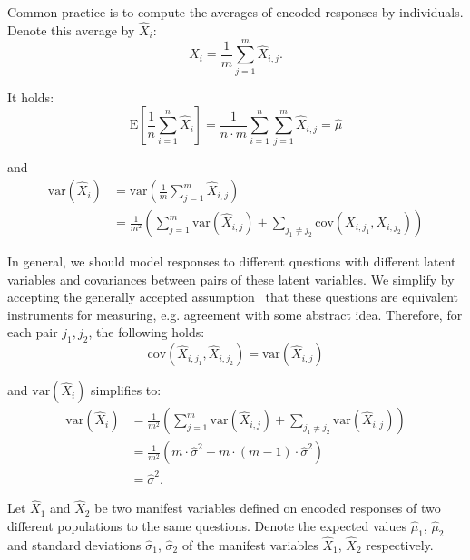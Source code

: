 \documentclass[10pt]{article}
\begin{document}
Common practice is to compute the averages of encoded responses by individuals. Denote this average by $\hat{X}_{i}$:
\begin{equation}
\hat{X}_{i} = \frac{1}{m} \sum_{j = 1}^{m} \hat{X}_{i, j}.
\end{equation}

It holds:
\begin{equation}
\mathrm{E}[\frac{1}{n} \sum_{i=1}^{n} \hat{X}_{i}] = \frac{1}{n \cdot m} \sum	_{i=1}^{n} \sum_{j=1}^{m} \hat{X}_{i,j} = \hat{\mu}
\end{equation}

and
\begin{align*}
\mathrm{var}(\hat{X}_{i}) &= \mathrm{var} \left( \frac{1}{m} \sum_{j=1}^{m} \hat{X}_{i, j} \right) \\
&= \frac{1}{m^{2}} \left( \sum_{j=1}^{m} \mathrm{var}(\hat{X}_{i,j}) + \sum_{j_{1} \neq j_{2}} \mathrm{cov}(X_{i,j_{1}}, X_{i, j_{2}})
\right)
\end{align*}

In general, we should model responses to different questions with different latent variables and covariances between pairs of these latent variables. We simplify by accepting the generally accepted assumption~\cite{Alphen} that these questions are equivalent instruments for measuring, e.g. agreement with some abstract idea. Therefore, for each pair $j_{1}, j_{2}$, the following holds:
\begin{equation}
\mathrm{cov}(\hat{X}_{i,j_{1}}, \hat{X}_{i, j_{2}}) = \mathrm{var}(\hat{X}_{i, j})
\end{equation}

and $\mathrm{var}(\hat{X}_{i})$ simplifies to:
\begin{align*}
\mathrm{var}(\hat{X}_{i}) &= \frac{1}{m^{2}} \left( \sum_{j=1}^{m} \mathrm{var}(\hat{X}_{i,j}) + \sum_{j_{1} \neq j_{2}} \mathrm{var}(\hat{X}_{i,j}) 
\right) \\
&= \frac{1}{m^{2}} \left(m \cdot \hat{\sigma}^{2} + m \cdot (m-1)\cdot \hat{\sigma}^{2} \right) \\
&= \hat{\sigma}^{2}.
\end{align*}

Let $\hat{X}_{1}$ and $\hat{X}_{2}$ be two manifest variables defined on encoded responses of two different populations to the same questions. Denote the expected values $\hat{\mu}_{1}$, $\hat{\mu}_{2}$ and standard deviations $\hat{\sigma}_{1}$, $\hat{\sigma}_{2}$ of the manifest variables $\hat{X}_{1}$, $\hat{X}_{2}$ respectively. 
\end{document}
